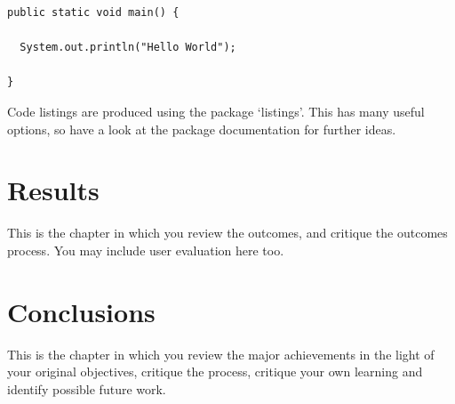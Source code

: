 \documentclass[12pt,a4paper]{report}
\begin{document}
\begin{lstlisting}[breaklines,breakatwhitespace,caption={Example code},label=Example-Code]
public static void main() {

  System.out.println("Hello World");

}
\end{lstlisting}

Code listings are produced using the package `listings'.  This has many useful options, so have a look at the package documentation for further ideas.

\chapter{Results}

This is the chapter in which you review the outcomes, and critique the outcomes process. You may include user evaluation here too.

\chapter{Conclusions}


This is the chapter in which you review the major achievements in the light of your original objectives, critique the process, critique your own learning and identify possible future work.



\appendix


\end{document}
